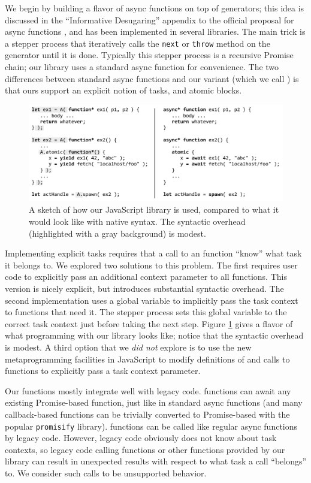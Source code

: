 \documentclass[acmsmall,anonymous,review]{acmart}\settopmatter{printfolios=true,printccs=false,printacmref=false}
\begin{document}
We begin by building a flavor of async functions on top of generators; this idea is discussed in the ``Informative Desugaring'' appendix to the official proposal for async functions \cite{Terlson2016}, and has been implemented in several libraries.
The main trick is a stepper process that iteratively calls the \texttt{next} or \texttt{throw} method on the generator until it is done.
Typically this stepper process is a recursive Promise chain; our library uses a standard async function for convenience.
The two differences between standard async functions and our variant (which we call \emph{\asyncs{}}) is that ours support an explicit notion of tasks, and atomic blocks.

\begin{figure}
\includegraphics[scale=0.75]{Code/trivial_js}
\caption{A sketch of how our JavaScript library is used, compared to what it would look like with native syntax.
  The syntactic overhead (highlighted with a gray background) is modest.}
\label{fig:trivial_js}
\end{figure}

Implementing explicit tasks requires that a call to an \asyncs{} function ``know'' what task it belongs to.
We explored two solutions to this problem.
The first requires user code to explicitly pass an additional context parameter to all \asyncs{} functions.
This version is nicely explicit, but introduces substantial syntactic overhead.
The second implementation uses a global variable to implicitly pass the task context to functions that need it.
The stepper process sets this global variable to the correct task context just before taking the next step.
Figure \ref{fig:trivial_js} gives a flavor of what programming with our library looks like; notice that the syntactic overhead is modest.
A third option that we \emph{did not} explore is to use the new metaprogramming facilities in JavaScript to modify definitions of and calls to \asyncs{} functions to explicitly pass a task context parameter.

Our \asyncs{} functions mostly integrate well with legacy code.
\asyncs{} functions can await any existing Promise-based function, just like in standard async functions (and many callback-based functions can be trivially converted to Promise-based with the popular \texttt{promisify} library).
\asyncs{} functions can be called like regular async functions by legacy code.
However, legacy code obviously does not know about task contexts, so legacy code calling \asyncs{} functions or other functions provided by our library can result in unexpected results with respect to what task a call ``belongs'' to.
We consider such calls to be unsupported behavior.
\end{document}
